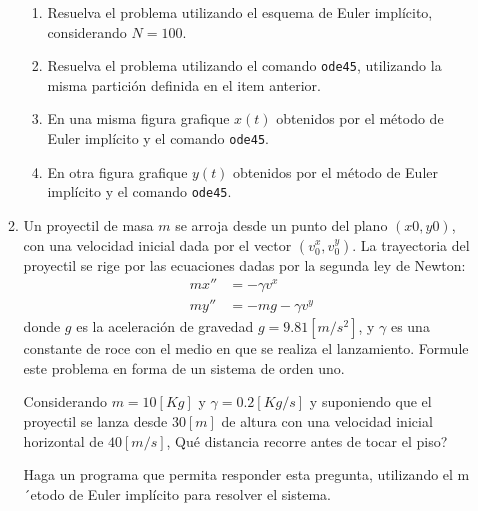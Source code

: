 \documentclass[letter,11pt]{article}
\begin{document}
\begin{enumerate}
\begin{enumerate}
\begin{enumerate}
\item Resuelva el problema utilizando el esquema de Euler impl\'icito, considerando $N=100$.

\item Resuelva el problema utilizando el comando \texttt{ode45}, utilizando la misma partici\'on definida en el item anterior.

\item En una misma figura grafique $x(t)$ obtenidos por el m\'etodo de Euler impl\'icito y el comando \texttt{ode45}.
\item En otra figura grafique $y(t)$ obtenidos por el m\'etodo de Euler impl\'icito y el comando \texttt{ode45}.
\end{enumerate}

\item Un proyectil de masa $m$ se arroja desde un punto del plano $(x0, y0)$, con una velocidad inicial dada por el vector $(v_0^x,v_0^y)$.  La trayectoria del proyectil se
rige por las ecuaciones dadas por la segunda ley de Newton:
$$
\begin{array}{cc}
mx'' &= −\gamma v^x\\
my'' &= −mg − \gamma v^y
\end{array}
$$
donde $g$ es la aceleraci\'on de gravedad $g = 9.81 [m/s^2]$, y $\gamma$ es una constante de roce con el
medio en que se realiza el lanzamiento. Formule este problema en forma de un sistema de orden
uno.

Considerando $ m = 10[Kg]$ y $\gamma = 0.2[Kg/s]$ y suponiendo que el proyectil se lanza desde $30[m]$
de altura con una velocidad inicial horizontal de $40 [m/s]$, \textquestiondown Qu\'e distancia recorre antes de tocar el piso?

Haga un programa que permita responder esta pregunta, utilizando el m´etodo de Euler impl\'icito para resolver el sistema.

\end{enumerate}



\end{enumerate}
\end{document}
